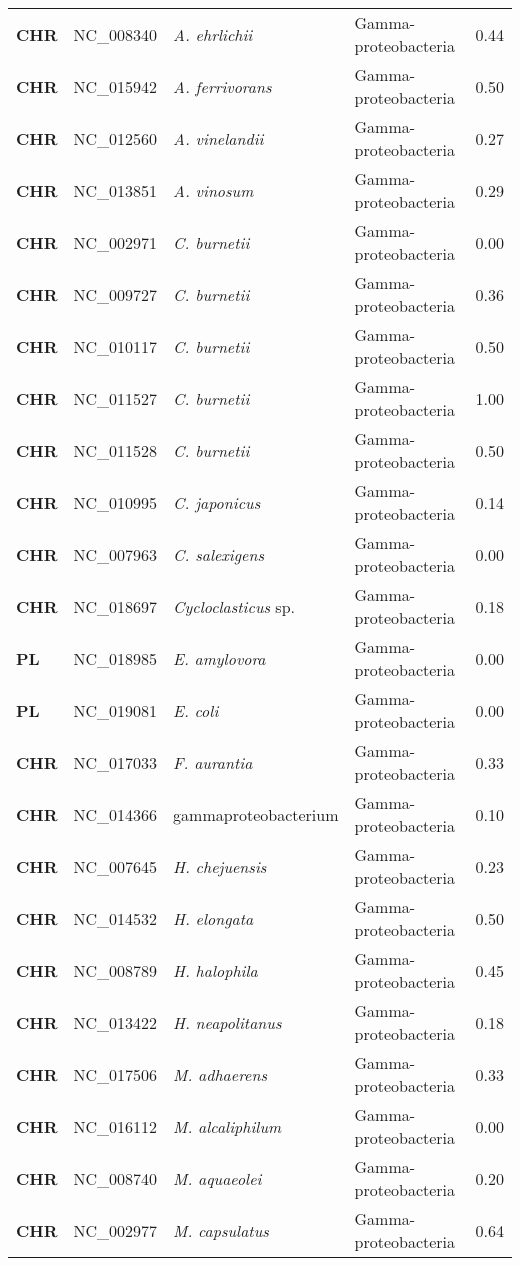 \begin{adjustwidth}{-3cm}{2cm}
{\begin{supertabular}{>{\bfseries}l|p{0.1\textwidth}p{0.14\textwidth}l|l}
CHR & NC\_008340 & \textit{A. ehrlichii} & Gamma-proteobacteria & 0.44\\
CHR & NC\_015942 & \textit{A. ferrivorans} & Gamma-proteobacteria & 0.50\\
CHR & NC\_012560 & \textit{A. vinelandii} & Gamma-proteobacteria & 0.27\\
CHR & NC\_013851 & \textit{A. vinosum} & Gamma-proteobacteria & 0.29\\
CHR & NC\_002971 & \textit{C. burnetii} & Gamma-proteobacteria & 0.00\\
CHR & NC\_009727 & \textit{C. burnetii} & Gamma-proteobacteria & 0.36\\
CHR & NC\_010117 & \textit{C. burnetii} & Gamma-proteobacteria & 0.50\\
CHR & NC\_011527 & \textit{C. burnetii} & Gamma-proteobacteria & 1.00\\
CHR & NC\_011528 & \textit{C. burnetii} & Gamma-proteobacteria & 0.50\\
CHR & NC\_010995 & \textit{C. japonicus} & Gamma-proteobacteria & 0.14\\
CHR & NC\_007963 & \textit{C. salexigens} & Gamma-proteobacteria & 0.00\\
CHR & NC\_018697 & \textit{Cycloclasticus} sp. & Gamma-proteobacteria & 0.18\\
PL & NC\_018985 & \textit{E. amylovora} & Gamma-proteobacteria & 0.00\\
PL & NC\_019081 & \textit{E. coli} & Gamma-proteobacteria & 0.00\\
CHR & NC\_017033 & \textit{F. aurantia} & Gamma-proteobacteria & 0.33\\
CHR & NC\_014366 & gammaproteobacterium & Gamma-proteobacteria & 0.10\\
CHR & NC\_007645 & \textit{H. chejuensis} & Gamma-proteobacteria & 0.23\\
CHR & NC\_014532 & \textit{H. elongata} & Gamma-proteobacteria & 0.50\\
CHR & NC\_008789 & \textit{H. halophila} & Gamma-proteobacteria & 0.45\\
CHR & NC\_013422 & \textit{H. neapolitanus} & Gamma-proteobacteria & 0.18\\
CHR & NC\_017506 & \textit{M. adhaerens} & Gamma-proteobacteria & 0.33\\
CHR & NC\_016112 & \textit{M. alcaliphilum} & Gamma-proteobacteria & 0.00\\
CHR & NC\_008740 & \textit{M. aquaeolei} & Gamma-proteobacteria & 0.20\\
CHR & NC\_002977 & \textit{M. capsulatus} & Gamma-proteobacteria & 0.64\\

\end{supertabular}}
\end{adjustwidth}
